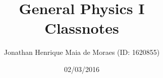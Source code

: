 \title{General Physics I \\ Classnotes}
\author{Jonathan Henrique Maia de Moraes (ID: 1620855)}
\date{02/03/2016}
\maketitle
